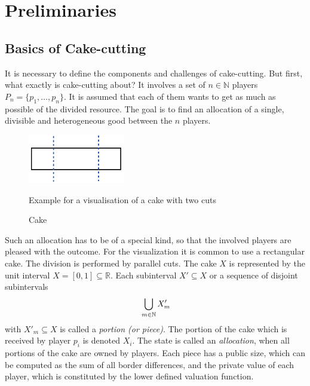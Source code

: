 \section{Preliminaries}
\subsection{Basics of Cake-cutting}
It is necessary to define the components and challenges of cake-cutting. But first, what exactly is cake-cutting about? It involves a set of $n \in \mathbb{N}$ players $P_n=\{p_1,\ldots,p_n\}$. It is assumed that each of them wants to get as much as possible of the divided resource. The goal is to find an allocation of a single, divisible and heterogeneous good between the $n$ players.  
	\begin{figure}[h]
		\centering
 		 \includegraphics[width=120pt]{kek.pdf}
   \caption{Cake}Example for a visualisation of a cake with two cuts
  	 \end{figure} 
Such an allocation has to be of a special kind, so that the involved players are pleased with the outcome. For the visualization it is common to use a rectangular cake. The division is performed by parallel cuts. The cake $X$ is represented by the unit interval $X=[0,1] \subseteq \mathbb{R}$. Each subinterval $X'\subseteq X$ or a sequence of disjoint subintervals $$\sideset{}{ }\bigcup\limits_{m\in\mathbb{N}}X'_m$$
with $X'_m\subseteq X$ is called a \emph{portion (or piece)}. The portion of the cake which is received by player $p_i$ is denoted $X_i$. The state is called an \emph{allocation}, when all portions of the cake are owned by players. Each piece has a public size, which can be computed as the sum of all border differences, and the private value of each player, which is constituted by the lower defined valuation function.\\


